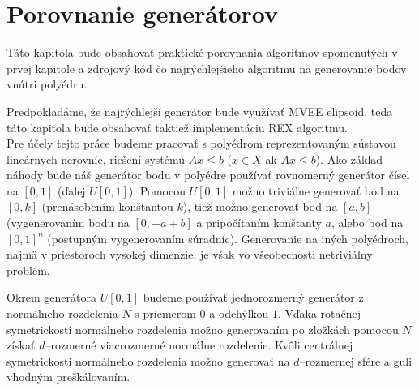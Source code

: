 \chapter{Porovnanie generátorov}

Táto kapitola bude obsahovať praktické porovnania algoritmov spomenutých v prvej kapitole a zdrojový kód čo najrýchlejšieho algoritmu na generovanie bodov vnútri polyédru.

Predpokladáme, že najrýchlejší generátor bude využívať MVEE elipsoid, teda táto kapitola bude obsahovať taktiež implementáciu REX algoritmu.\\

Pre účely tejto práce budeme pracovať s polyédrom reprezentovaným sústavou lineárnych nerovníc, riešení systému $Ax \leq b$ ($x \in X$ ak $Ax \leq b$).
Ako základ náhody bude náš generátor bodu v polyédre používať rovnomerný generátor čísel na $[0,1]$ (ďalej $U[0,1]$). Pomocou $U[0,1]$ možno triviálne generovať bod na $[0,k]$ (prenásobením konštantou $k$), tiež možno generovať bod na $[a,b]$ (vygenerovaním bodu na $[0, -a+b]$ a pripočítaním konštanty $a$, alebo bod na $[0,1]^n$ (postupným vygenerovaním súradníc). Generovanie na iných polyédroch, najmä v priestoroch vysokej dimenzie, je však vo všeobecnosti netriviálny problém.

Okrem generátora $U[0,1]$ budeme používať jednorozmerný generátor z normálneho rozdelenia $N$ s priemerom $0$ a odchýlkou $1$. Vďaka rotačnej symetrickosti normálneho rozdelenia možno generovaním po zložkách pomocou $N$ získať $d$--rozmerné viacrozmerné normálne rozdelenie.
Kvôli centrálnej symetrickosti normálneho rozdelenia možno generovať na $d$--rozmernej sfére a guli vhodným preškálovaním. 
